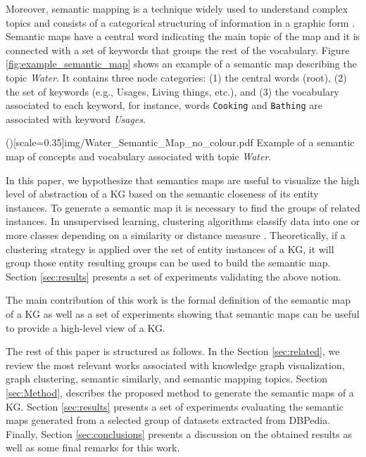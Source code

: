 \documentclass{ieeeaccess}
\begin{document}
Moreover, semantic mapping is a technique widely used to understand
complex topics and consists of a categorical structuring of information 
in a graphic form \cite{johnson1986semantic}. Semantic maps have 
a central word indicating the main topic of the map and it is 
connected with a set of keywords that groups the rest of the vocabulary. 
Figure  \ref{fig:example_semantic_map} shows an
example of a semantic map describing the topic \textit{Water}. It
contains three node categories: (1) the central words (root), (2)
the set of keywords (e.g., Usages, Living things, etc.), and (3) the
vocabulary associated to each keyword, for instance, words
\texttt{Cooking} and \texttt{Bathing} are associated with keyword 
\textit{Usages}.

\Figure[h]()[scale=0.35]{img/Water_Semantic_Map_no_colour.pdf}
{Example of a semantic map of concepts and vocabulary  associated with topic
 \textit{Water}.\label{fig:example_semantic_map}}


In this paper, we hypothesize 
that semantics maps are useful to visualize the high level of abstraction of 
a KG based on the semantic closeness of its entity instances. To
generate a semantic map it is necessary to find the groups of related 
instances. In unsupervised learning, clustering algorithms classify data 
into one or more classes depending on a similarity or distance measure 
\cite{SCHAEFFER200727}. Theoretically, if a clustering strategy is applied
over the set of entity instances of a KG, it will group those entity
resulting groups can be used to build the semantic map.
Section \ref{sec:results} presents a set of experiments validating the
above notion.

The main contribution of this work is the formal definition of the 
semantic map of a KG as well as a set of experiments showing that semantic
maps can be useful to provide a high-level view of a KG.


The rest of this paper is structured as follows. In the Section
\ref{sec:related}, we review the most relevant works associated with 
knowledge graph visualization, graph clustering, semantic similarly, and 
semantic mapping topics. Section \ref{sec:Method}, describes the proposed
method to generate the semantic maps of a KG. Section \ref{sec:results} 
presents a set of experiments evaluating the semantic maps generated from 
a selected group of datasets extracted from DBPedia. Finally, Section
\ref{sec:conclusions} presents a discussion on the obtained results as
well as some final remarks for this work.
\end{document}
